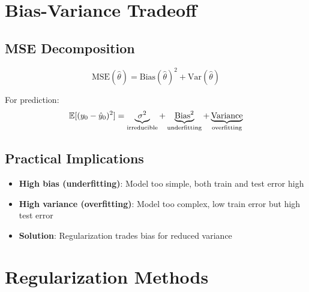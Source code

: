 \documentclass[main.tex]{subfiles}
\begin{document}
\section{Bias-Variance Tradeoff}

\subsection{MSE Decomposition}

$$\text{MSE}(\hat{\theta}) = \text{Bias}(\hat{\theta})^2 + \text{Var}(\hat{\theta})$$

For prediction:
$$\mathbb{E}[(y_0 - \hat{y}_0)^2] = \underbrace{\sigma^2}_{\text{irreducible}} + \underbrace{\text{Bias}^2}_{\text{underfitting}} + \underbrace{\text{Variance}}_{\text{overfitting}}$$

\subsection{Practical Implications}

\begin{itemize}
    \item \textbf{High bias (underfitting)}: Model too simple, both train and test error high
    \item \textbf{High variance (overfitting)}: Model too complex, low train error but high test error
    \item \textbf{Solution}: Regularization trades bias for reduced variance
\end{itemize}

\begin{center}
\end{center}

\section{Regularization Methods}
\end{document}
